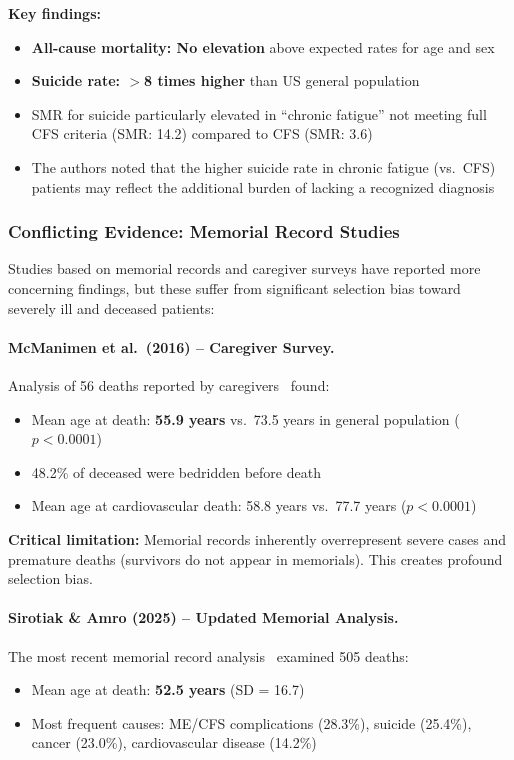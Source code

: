 \textbf{Key findings:}
\begin{itemize}
    \item \textbf{All-cause mortality: No elevation} above expected rates for age and sex
    \item \textbf{Suicide rate: $>$8 times higher} than US general population
    \item SMR for suicide particularly elevated in ``chronic fatigue'' not meeting full CFS criteria (SMR: 14.2) compared to CFS (SMR: 3.6)
    \item The authors noted that the higher suicide rate in chronic fatigue (vs.\ CFS) patients may reflect the additional burden of lacking a recognized diagnosis
\end{itemize}

\subsubsection{Conflicting Evidence: Memorial Record Studies}

Studies based on memorial records and caregiver surveys have reported more concerning findings, but these suffer from significant selection bias toward severely ill and deceased patients:

\paragraph{McManimen et al.\ (2016) -- Caregiver Survey.}
Analysis of 56 deaths reported by caregivers~\cite{McManimen2016} found:
\begin{itemize}
    \item Mean age at death: \textbf{55.9 years} vs.\ 73.5 years in general population ($p < 0.0001$)
    \item 48.2\% of deceased were bedridden before death
    \item Mean age at cardiovascular death: 58.8 years vs.\ 77.7 years ($p < 0.0001$)
\end{itemize}

\textbf{Critical limitation:} Memorial records inherently overrepresent severe cases and premature deaths (survivors do not appear in memorials). This creates profound selection bias.

\paragraph{Sirotiak \& Amro (2025) -- Updated Memorial Analysis.}
The most recent memorial record analysis~\cite{Sirotiak2025} examined 505 deaths:
\begin{itemize}
    \item Mean age at death: \textbf{52.5 years} (SD = 16.7)
    \item Most frequent causes: ME/CFS complications (28.3\%), suicide (25.4\%), cancer (23.0\%), cardiovascular disease (14.2\%)
\end{itemize}

